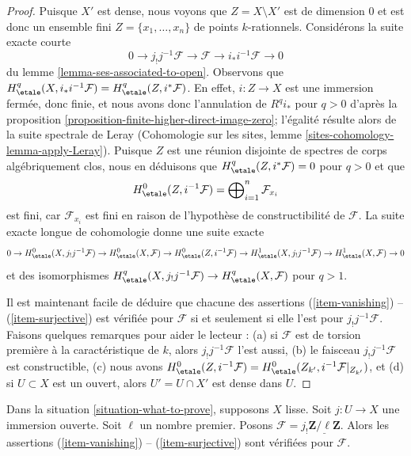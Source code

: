 \begin{proof}
Puisque $X'$ est dense, nous voyons que $Z = X \setminus X'$ est de dimension $0$
et est donc un ensemble fini $Z = \{x_1, \ldots, x_n\}$ de points $k$-rationnels.
Considérons la suite exacte courte
$$
0 \to j_!j^{-1}\mathcal{F} \to \mathcal{F} \to i_*i^{-1}\mathcal{F} \to 0
$$
du lemme \ref{lemma-ses-associated-to-open}. Observons que
$H^q_\etale(X, i_*i^{-1}\mathcal{F}) = H^q_\etale(Z, i^*\mathcal{F})$.
En effet, $i : Z \to X$ est une immersion fermée, donc finie,
et nous avons donc l'annulation de $R^qi_*$ pour $q > 0$ d'après la
proposition \ref{proposition-finite-higher-direct-image-zero};
l'égalité résulte alors de la suite spectrale de Leray
(Cohomologie sur les sites, lemme \ref{sites-cohomology-lemma-apply-Leray}).
Puisque $Z$ est une réunion disjointe de spectres de corps algébriquement
clos, nous en déduisons que $H^q_\etale(Z, i^*\mathcal{F}) = 0$
pour $q > 0$ et que
$$
H^0_\etale(Z, i^{-1}\mathcal{F}) =
\bigoplus\nolimits_{i=1}^n \mathcal{F}_{x_i}
$$
est fini, car $\mathcal{F}_{x_i}$ est fini en raison de
l'hypothèse de constructibilité de $\mathcal{F}$.
La suite exacte longue de cohomologie donne une suite exacte
$$
0 \to
H^0_\etale(X, j_!j^{-1}\mathcal{F}) \to
H^0_\etale(X, \mathcal{F}) \to
H^0_\etale(Z, i^{-1}\mathcal{F}) \to
H^1_\etale(X, j_!j^{-1}\mathcal{F}) \to
H^1_\etale(X, \mathcal{F}) \to 0
$$
et des isomorphismes $H^q_\etale(X, j_!j^{-1}\mathcal{F}) \to
H^q_\etale(X, \mathcal{F})$ pour $q > 1$.

\medskip\noindent
Il est maintenant facile de déduire que chacune des assertions 
(\ref{item-vanishing}) -- (\ref{item-surjective})
est vérifiée pour $\mathcal{F}$ si et seulement si elle l'est pour
$j_!j^{-1}\mathcal{F}$. Faisons quelques remarques pour aider le lecteur :
(a) si $\mathcal{F}$ est de torsion première à la caractéristique
de $k$, alors $j_!j^{-1}\mathcal{F}$ l'est aussi,
(b) le faisceau $j_!j^{-1}\mathcal{F}$ est constructible,
(c) nous avons $H^0_\etale(Z, i^{-1}\mathcal{F}) =
H^0_\etale(Z_{k'}, i^{-1}\mathcal{F}|_{Z_{k'}})$, et (d)
si $U \subset X$ est un ouvert, alors $U' = U \cap X'$ est dense dans $U$.
\end{proof}

\begin{lemma}
\label{lemma-even-easier}
Dans la situation \ref{situation-what-to-prove}, supposons $X$ lisse.
Soit $j : U \to X$ une immersion ouverte. Soit $\ell$ un nombre premier.
Posons $\mathcal{F} = j_!\underline{\mathbf{Z}/\ell\mathbf{Z}}$.
Alors les assertions (\ref{item-vanishing}) -- (\ref{item-surjective}) sont vérifiées
pour $\mathcal{F}$.
\end{lemma}

